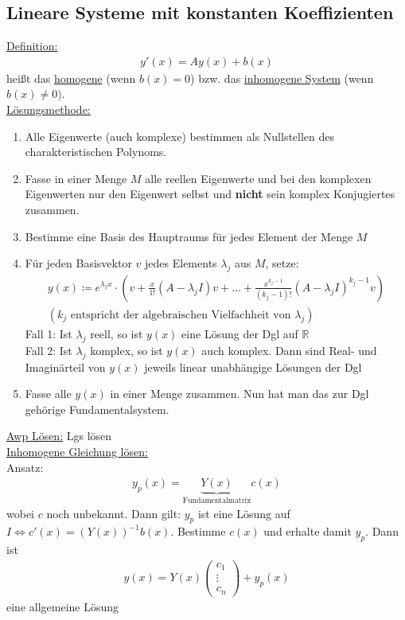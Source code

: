\documentclass{article}
\begin{document}
\subsection{Lineare Systeme mit konstanten Koeffizienten}
\underline{Definition:}
\begin{align*}
    y'(x) = Ay(x) + b(x)
\end{align*}
heißt das \underline{homogene} (wenn $b(x) = 0$) bzw. das \underline{inhomogene System} (wenn $b(x) \neq 0)$. \\
\underline{Lösungsmethode:}
\begin{enumerate}
    \item Alle Eigenwerte (auch komplexe) bestimmen als Nullstellen des charakteristischen Polynoms.
    \item Fasse in einer Menge $M$ alle reellen Eigenwerte und bei den komplexen Eigenwerten nur den Eigenwert selbst und \textbf{nicht} sein komplex Konjugiertes zusammen.
    \item Bestimme eine Basis des Hauptraums für jedes Element der Menge $M$
    \item Für jeden Basisvektor $v$ jedes Elements $\lambda_j$ aus $M$, setze:
    \begin{align*}
        y(x) \coloneqq e^{\lambda_jx} \cdot (v+\frac{x}{1!}(A-\lambda_jI)v+ \ldots + \frac{x^{k_j-1}}{(k_j-1)!}(A-\lambda_jI)^{k_j-1}v) \\
        (k_j  \text{ entspricht der algebraischen Vielfachheit von }\lambda_j)
    \end{align*}
    Fall 1: Ist $\lambda_j$ reell, so ist $y(x)$ eine Lösung der Dgl auf $\mathbb{R}$ \\
    Fall 2: Ist $\lambda_j$ komplex, so ist $y(x)$ auch komplex. Dann sind Real- und Imaginärteil von $y(x)$ jeweils linear unabhängige Lösungen der Dgl
    \item Fasse alle $y(x)$ in einer Menge zusammen. Nun hat man das zur Dgl gehörige Fundamentalsystem.
\end{enumerate}
\underline{Awp Lösen:} Lgs lösen \\
\underline{Inhomogene Gleichung lösen:} \\
Ansatz: 
\begin{align*}
    y_p(x) = \underbrace{Y(x)}_{\text{Fundamentalmatrix}}c(x) 
\end{align*}
wobei $c$ noch unbekannt. Dann gilt: $y_p$ ist eine Lösung auf $I \Leftrightarrow c'(x)=(Y(x))^{-1}b(x)$. Bestimme $c(x)$ und erhalte damit $y_p$.
Dann ist 
\begin{align*}
    y(x) = Y(x) \begin{pmatrix} c_1 \\ \vdots \\ c_n\end{pmatrix} + y_p(x)
\end{align*}
eine allgemeine Lösung
\end{document}
